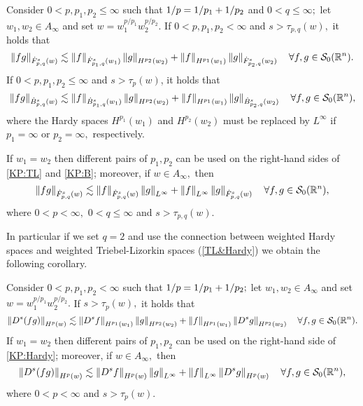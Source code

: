 \begin{corollary}\label{coro:KP:TL:B}  Consider  $0 < p, p_1, p_2  \le \infty$  such that $\hcline$ and  $0 < q \leq \infty;$ let  $w_1,w_2\in A_\infty$ and set $w=w_1^{{p}/{p_1}} w_2^{{p}/{p_2}}.$ 
If $0 < p ,p_1,p_2< \infty$ and  $s > \tau_{p,q}(w),$ it holds that
\begin{equation}\label{KP:TL}
\norm{fg}{\tlw{p}{s}{q}{w}} \lesssim \norm{f}{\tlw{p_1}{s}{q}{w_1}} \norm{g}{H^{p_2}(w_2)} +  \norm{f}{H^{p_1}(w_1)}   \norm{g}{\tlw{p_2}{s}{q}{w_2}} \quad \forall f, g \in \swz.
\end{equation}
If $0 < p, p_1,p_2 \le \infty$ and $s > \tau_p(w)$, it holds that
\begin{equation}\label{KP:B}
\norm{fg}{\besw{p}{s}{q}{w}} \lesssim \norm{f}{\besw{p_1}{s}{q}{w_1}} \norm{g}{H^{p_2}(w_2)} +  \norm{f}{H^{p_1}(w_1)}   \norm{g}{\besw{p_2}{s}{q}{w_2}} \quad \forall f, g \in \swz,
\end{equation}
where the Hardy spaces $H^{p_1}(w_1)$ and $H^{p_2}(w_2)$ must be replaced by $L^\infty$ if $p_1=\infty$ or $p_2=\infty,$ respectively.

If $w_1=w_2$ then different pairs of $p_1, p_2$ can be used on the right-hand sides of \eqref{KP:TL} and \eqref{KP:B}; moreover, if $w\in A_\infty,$ then 
\begin{equation}\label{KP:TL2}
\norm{fg}{\tlw{p}{s}{q}{w}} \lesssim \norm{f}{\tlw{p}{s}{q}{w}} \norm{g}{L^\infty} +  \norm{f}{L^\infty}   \norm{g}{\tlw{p}{s}{q}{w}} \quad \forall f, g \in \swz,
\end{equation}
where $0<p<\infty,$ $0<q\le \infty$ and $s>\tau_{p,q}(w).$
\end{corollary}


In particular if we set $q=2$ and use the connection between weighted Hardy spaces and weighted Triebel-Lizorkin spaces (\ref{TL&Hardy}) we obtain the following corollary. 

\begin{corollary}\label{coro:KP:Hardy} 
Consider  $0 < p, p_1, p_2  < \infty$  such that $\hcline;$ let  $w_1,w_2\in A_\infty$ and set $w=w_1^{{p}/{p_1}} w_2^{{p}/{p_2}}.$ 
If  $s > \tau_{p}(w),$ it holds that
\begin{equation}\label{KP:Hardy}
\norm{D^s(fg)}{H^p(w)} \lesssim \norm{D^s f}{H^{p_1}(w_1)} \norm{g}{H^{p_2}(w_2)} +  \norm{f}{H^{p_1}(w_1)}   \norm{D^s g}{H^{p_2}(w_2)} \quad \forall f, g \in \swz.
\end{equation}
If $w_1=w_2$ then different pairs of $p_1, p_2$ can be used on the right-hand side of \eqref{KP:Hardy}; moreover, if $w\in A_\infty,$ then 
\begin{equation*}
\norm{D^s(fg)}{H^p(w)} \lesssim \norm{D^s f}{H^{p}(w)} \norm{g}{L^\infty} +  \norm{f}{L^\infty}   \norm{D^s g}{H^{p}(w)} \quad \forall f, g \in \swz,
\end{equation*}
where $0<p<\infty$ and $s>\tau_{p}(w).$
\end{corollary}
 

